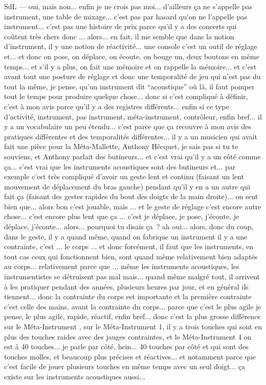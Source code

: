 SdL — oui, mais non... enfin je ne crois pas moi... d'ailleurs ça ne s'appelle pas instrument, une table de mixage... c'est pas par hasard qu'on ne l'appelle pas instrument... c'est pas une histoire de prix parce qu'il y a des concerts qui coûtent très chers donc ... alors... en fait, il me semble que dans la notion d'instrument, il y une notion de réactivité... une console c'est un outil de réglage et... et donc on pose, on déplace, on écoute, on bouge un, deux boutons en même temps... et s'il y a plus, on fait une mémoire et on rappelle la mémoire... et c'est avant tout une posture de réglage et donc une temporalité de jeu qui n'est pas du tout la même, je pense, qu'un instrument dit ``acoustique'' où là, il faut pomper tout le temps pour produire quelque chose... donc si c'est compliqué à définir, c'est à mon avis parce qu'il y a des registres différents... enfin si ce type d'activité, instrument, pas instrument, méta-instrument, contrôleur, enfin bref... il y a un vocabulaire un peu étendu... c'est parce que ça recouvre à mon avis des pratiques différentes et des temporalités différentes... il y a un musicien qui avait fait une pièce pour la Méta-Mallette, Anthony Hécquet, je sais pas si tu te souviens, et Anthony parlait des butineurs... et c'est vrai qu'il y a un côté comme ça... c'est vrai que les instruments acoustiques sont des butineurs et... par exemple c'est très compliqué d'avoir un geste lent et continu (faisant un lent mouvement de déplacement du bras gauche) pendant qu'il y en a un autre qui fait ça (faisant des gestes rapides du bout des doigts de la main droite)... on sent bien que... alors bon c'est jouable, mais ... et le geste de réglage c'est encore autre chose... c'est encore plus lent que ça ... c'est je déplace, je pose, j'écoute, je déplace, j'écoute... alors... pourquoi tu disais ça ? ah oui... alors, donc du coup, dans le geste, il y a quand même, quand on fabrique un instrument il y a une contrainte, c'est ... le corps ... et donc forcément, il faut que les instruments, en tout cas ceux qui fonctionnent bien, sont quand même relativement bien adaptés au corps... relativement parce que ... même les instruments acoustiques, les instrumentistes se détruisent pas mal mais... quand même malgré tout, il arrivent à les pratiquer pendant des années, plusieurs heures par jour, et en général ils tiennent... donc la contrainte du corps est importante et la première contrainte c'est celle des mains, avant la contrainte du corps... parce que c'est le plus agile je pense, le plus agile, rapide, réactif, enfin bref... donc c'est la plus grosse différence sur le Méta-Instrument , sur le Méta-Instrument 1, il y a trois touches qui sont en plus des touches raides avec des jauges contraintes, et le Méta-Instrument 4 on est à 40 touches... je parle par côté, hein... 40 touches par côté et qui sont des touches molles, et beaucoup plus précises et réactives... et notamment parce que c'est facile de jouer plusieurs touches en même temps avec un seul doigt... ça existe sur les instruments acoustiques aussi... 

